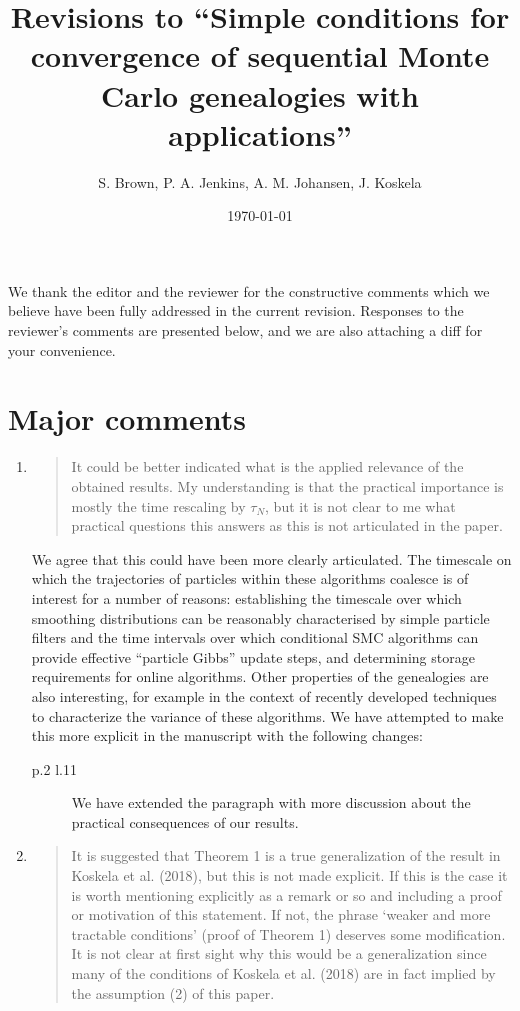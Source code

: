 \documentclass{article}
\title{Revisions to ``Simple conditions for convergence of sequential Monte Carlo genealogies with applications''}
\author{S. Brown, P. A. Jenkins, A. M. Johansen, J. Koskela}
\date{\today}
\newcommand{\rquote}[1]{{\color{blue}\it \begin{quotation}#1\end{quotation}}}
\begin{document}
\maketitle

We thank the editor and the reviewer for the constructive comments which we believe have been fully addressed in the current revision.
Responses to the reviewer's comments are presented below, and we are also attaching a diff for your convenience.

\section*{Major comments}
\begin{enumerate}
\item
\rquote{It could be better indicated what is the applied relevance of the obtained results. My
understanding is that the practical importance is mostly the time rescaling by $\tau_N$, but it
is not clear to me what practical questions this answers as this is not articulated in the
paper.}

We agree that this could have been more clearly articulated. The timescale on which the trajectories of particles within these algorithms coalesce is of interest for a number of reasons: establishing the timescale over which smoothing distributions can be reasonably characterised by simple particle filters and the time intervals over which conditional SMC algorithms can provide effective ``particle Gibbs'' update steps, and determining storage requirements for online algorithms. Other properties of the genealogies are also interesting, for example in the context of recently developed techniques to characterize the variance of these algorithms. We have attempted to make this more explicit in the manuscript with the following changes: 
\begin{description}
\item[p.2 l.11] We have extended the paragraph with more discussion about the practical consequences of our results.
\end{description}

\item
  \rquote{It is suggested that Theorem 1 is a true generalization of the result in Koskela et al. (2018),
but this is not made explicit. If this is the case it is worth mentioning explicitly as a remark
or so and including a proof or motivation of this statement. If not, the phrase ‘weaker and
more tractable conditions’ (proof of Theorem 1) deserves some modification. It is not clear
at first sight why this would be a generalization since many of the conditions of Koskela et
al. (2018) are in fact implied by the assumption (2) of this paper.}


\end{enumerate}
\end{document}
